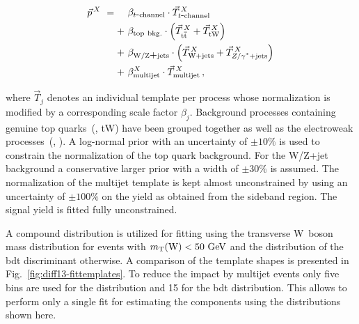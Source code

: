 \begin{subequations}
\begin{align}
\vec{p}^{\,X}~=\hphantom{+}&~\beta_{t\mathrm{\mbox{-}channel}}\cdot \vec{T}_{t\mathrm{\mbox{-}channel}}^{\,X}\\
+&~\beta_\mathrm{top~bkg.}\cdot\Big(\vec{T}^{\,X}_{\ttbar}+\vec{T}^{\,X}_\mathrm{tW}\Big)\\
+&~\beta_\mathrm{W/Z\mbox{+}jets}\cdot\Big(\vec{T}^{\,X}_{\wjets}+\vec{T}^{\,X}_{\zjets}\Big)\\
+&~\beta_\mathrm{multijet}^{X}\cdot \vec{T}^{\,X}_\mathrm{multijet}\,,
\end{align}
\end{subequations}

where $\vec{T}_{j}$ denotes an individual template per process whose normalization is modified by a corresponding scale factor $\beta_{j}$. Background processes containing genuine top quarks~(\ttbar, tW) have been grouped together as well as the electroweak processes~(\wjets, \zjets). A log-normal prior with an uncertainty of $\pm10\%$ is used to constrain the normalization of the top quark background. For the W/Z+jet background a conservative larger prior with a width of $\pm30\%$ is assumed. The normalization of the multijet template is kept almost unconstrained by using an uncertainty of $\pm100\%$ on the yield as obtained from the sideband region. The signal yield is fitted fully unconstrained.

A compound distribution is utilized for fitting using the transverse W~boson mass distribution for events with $m_{\textrm{T}}(\textrm{W})<50~\textrm{GeV}$ and the distribution of the \gls{bdt} discriminant otherwise. A comparison of the template shapes is presented in Fig.~\ref{fig:diff13-fittemplates}. To reduce the impact by multijet events only five bins are used for the \mtw distribution and 15 for the \gls{bdt} distribution. This allows to perform only a single fit for estimating the components using the distributions shown here. 



